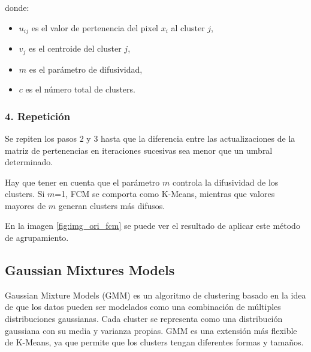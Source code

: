 donde:

\begin{itemize}
\setlength{\itemsep}{-1ex}
   \item{\begin{flushleft} $u_{ij}$ es el valor de pertenencia del pixel $x_i$ al cluster $j$, \end{flushleft}}
   \item{\begin{flushleft} $v_j$ es el centroide del cluster $j$, \end{flushleft}}
   \item{\begin{flushleft} $m$ es el parámetro de difusividad, \end{flushleft}}
   \item{\begin{flushleft} $c$ es el número total de clusters. \end{flushleft}}
\end{itemize}

\subsubsection{4. Repetición}

Se repiten los pasos 2 y 3 hasta que la diferencia entre las actualizaciones de la matriz de pertenencias en iteraciones sucesivas sea menor que un umbral determinado.

Hay que tener en cuenta que el parámetro $m$ controla la difusividad de los clusters. Si $m$=1, FCM se comporta como K-Means, mientras que valores mayores de $m$ generan clusters más difusos.

En la imagen \ref{fig:img_ori_fcm} se puede ver el resultado de aplicar este método de agrupamiento.

\subsection{Gaussian Mixtures Models}\label{gaussian-mixtures-models}
Gaussian Mixture Models (GMM) \cite{MATLAB:2023bGMM} es un algoritmo de clustering basado en la idea de que los datos pueden ser modelados como una combinación de múltiples distribuciones gaussianas. Cada cluster se representa como una distribución gaussiana con su media y varianza propias. GMM es una extensión más flexible de K-Means, ya que permite que los clusters tengan diferentes formas y tamaños.

